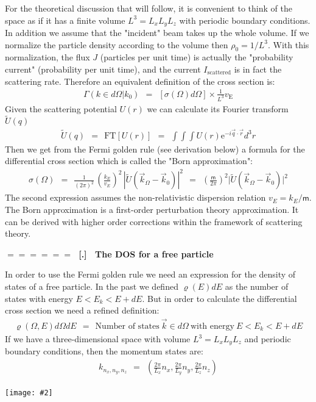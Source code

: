 \documentclass[onecolumn,fleqn]{revtex4}
\newcommand{\eexp}{\mathrm{e}^}
\newcommand{\mass}{\mathsf{m}}
\newcommand{\gdos}{\varrho} \newcommand{\EPS}{\mathcal{E}}
\newcommand{\tbox}[1]{\text{#1}}
\newcommand{\putgraph}[2][0.30\hsize]{\texttt{[image: \#2]}}
\newcommand{\beq}{\begin{eqnarray}}
\newcommand{\eeq}{\end{eqnarray}}
\renewcommand{\thesubsection}{\arabic{subsection}}
\renewcommand{\thesubsubsection}{\arabic{subsubsection}}
\newcommand{\sheadC}[1]
{
\addtocounter{subsubsection}{1}
\vspace{5mm}
{\Large\bf $=\!=\!=\!=\!=\!=\;$ [\thesubsection.\thesubsubsection] \ #1}  
\nopagebreak
\phantomsection
}
\begin{document}
For the theoretical discussion that will follow, 
it is convenient to think of the space as if it has a finite 
volume ${ L^3 = L_x L_y L_z}$ with periodic boundary 
conditions. In addition we assume that the "incident" 
beam takes up the whole volume. If we normalize the particle 
density according to the volume then ${\rho_0=1/L^3}$. 
With this normalization, the flux $J$ (particles per unit time) 
is actually the "probability current" (probability per unit time), 
and the current $I_{\text{scattered}}$ is in fact 
the scattering rate. Therefore an equivalent definition 
of the cross section is:
\beq
\Gamma( k \in d\Omega | k_0 )  \ \ = \ \  [\sigma(\Omega)d\Omega] \times \frac{1}{L^3}v_{\tbox{E}} 
\eeq
Given the scattering potential $U(r)$ we can calculate 
its Fourier transform ${\tilde{U}(q)}$
\beq
\tilde{U}(q)  \ \ = \ \  \text{FT} [U(r)]  
 \ \ = \ \  \int\int\int U(r) \eexp{-i\vec{q} \cdot \vec{r}} d^3r 
\eeq
Then we get from the Fermi golden rule (see derivation below) 
a formula for the differential cross section 
which is called the "Born approximation":
\beq
\sigma(\Omega)
\ \ = \ \ 
\frac{1}{ (2\pi)^2 } \, \left(\frac{k_E}{v_E}\right)^2 \, |\tilde{U}(\vec{k}_{\Omega}-\vec{k}_0)|^2 
\ \ = \ \ 
\left(\frac{\mass}{2\pi}\right)^2 \Big|\tilde{U}(\vec{k}_{\Omega}-\vec{k}_{0})\Big|^2 
\eeq
The second expression assumes the non-relativistic 
dispersion relation ${v_E=k_E/\mass}$.   
The Born approximation is a first-order 
perturbation theory approximation. 
It can be derived with higher order corrections  
within the framework of scattering theory.


 
\sheadC{The DOS for a free particle} 

In order to use the Fermi golden rule we need an expression 
for the density of states of a free particle. In the past 
we defined ${\gdos(E)dE}$ as the number of states 
with energy ${E<E_k<E+dE}$. But in order to calculate 
the differential cross section we need a refined definition:
\beq
\gdos(\Omega,E) d\Omega dE
 \ \  = \ \  
\text{Number of states} \ \vec{k} \in d\Omega  \ \mbox{with energy} \ E< E_k<E+dE  
\eeq
If we have a three-dimensional space with 
volume ${ L^3 = L_x L_y L_z }$ and periodic  
boundary conditions, then the momentum states are:
\beq
k_{n_x,n_y,n_z}
 \ \ = \ \  
\left( \frac{2\pi}{L_x}n_x, \frac{2\pi}{L_y}n_y, \frac{2\pi}{L_z}n_z\right) 
\eeq


\begin{center}
\putgraph[0.4\hsize]{AllowedStates}
\end{center}
\end{document}
